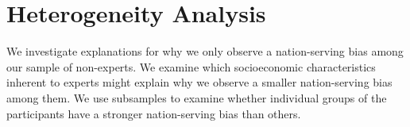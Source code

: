 
\clearpage
\section{Heterogeneity Analysis}

We investigate explanations for why we only observe a nation-serving bias among our sample of non-experts. 
We examine which socioeconomic characteristics inherent to experts might explain why we observe a smaller nation-serving bias among them. We use subsamples to examine whether individual groups of the participants have a stronger nation-serving bias than others.
\\

